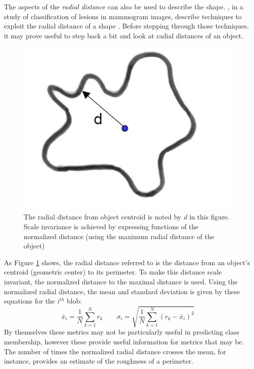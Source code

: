 \documentclass[letterpaper]{article}
\begin{document}
{{The aspects of the \textit{radial distance} can also be used to describe the shape. \citeauthor{Kilday1993-aq}, in a study of classification of lesions in mammogram images, describe techniques to exploit the radial distance of a shape \parencite{Kilday1993-aq}. Before stepping through those techniques, it may prove useful to step back a bit and look at radial distances of an object.
\begin{figure}[H]
	\centering
	\includegraphics[width=.25\linewidth]{./figures/radial-distance.jpg}
	\caption[Radial distance from object centroid]{The radial distance from object centroid is noted by \textit{d} in this figure. Scale invariance is achieved by expressing functions of the normalized distance (using the maximum radial distance of the object)}
	\label{fig:radial-distance}	
\end{figure}
As Figure \ref{fig:radial-distance} shows, the radial distance referred to is the distance from an object's centroid (geometric center) to its perimeter. To make this distance scale invariant, the normalized distance to the maximal distance is used. Using the normalized radial distance, the mean and standard deviation is given by these equations for the $i^{th}$ blob:
\begin{equation}%
\bar{x}_i = \frac{1}{N}\sum_{k=1}^{N}r_k \qquad
\sigma_i = \sqrt{\frac{1}{N}\sum_{k=1}^{N}({r_k} - \bar{x}_i)^2}
\end{equation}
By themselves these metrics may not be particularly useful in predicting class membership, however these provide useful information for metrics that may be. The number of times the normalized radial distance crosses the mean, for instance, provides an estimate of the roughness of a perimeter.


}}
\end{document}

